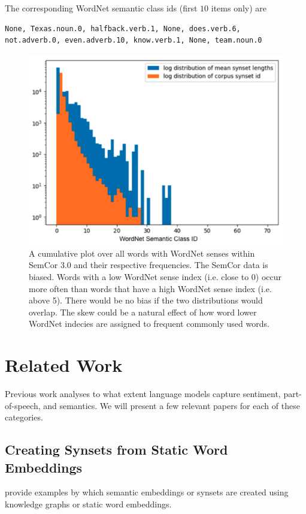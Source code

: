 \documentclass[a4paper,12pt,oneside,openright]{report}
\begin{document}
The corresponding WordNet semantic class ids (first $10$ items only) are

\begin{tcolorbox}
\begin{verbatim}
None, Texas.noun.0, halfback.verb.1, None, does.verb.6,
not.adverb.0, even.adverb.10, know.verb.1, None, team.noun.0
\end{verbatim}
\end{tcolorbox}
\begin{figure}[h]
	\center
  \includegraphics[width=0.5\linewidth]{./assets/background/semcor_skew.png}
  \caption{
  A cumulative plot over all words with WordNet senses within SemCor 3.0 and their respective frequencies.
  The SemCor data is biased.
  Words with a low WordNet sense index (i.e. close to 0) occur more often than words that have a high WordNet sense index (i.e. above 5). 
  There would be no bias if the two distributions would overlap.
  The skew could be a natural effect of how word lower WordNet indecies are assigned to frequent commonly used words.
  }
  \label{fig:embeddings_by_language}
\end{figure}

\chapter{Related Work}\label{section:RelatedWork} 

Previous work analyses to what extent language models capture sentiment, part-of-speech, and semantics.
We will present a few relevant papers for each of these categories.

\section{Creating Synsets from Static Word Embeddings}\label{section_clustering}

\cite{pelevina16, biemann13, remus18, arefyev19, denkowski09} provide examples by which semantic embeddings or synsets are created using knowledge graphs or static word embeddings.
\end{document}
